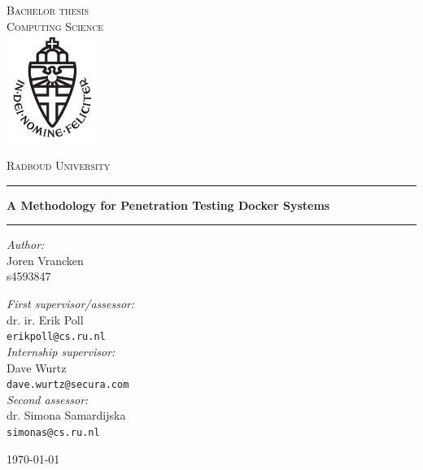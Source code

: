 \documentclass[11pt,a4paper]{report}
\begin{document}
    \hypersetup{pageanchor=false}
    \begin{titlepage}
        \begin{center}
            \textsc{\LARGE Bachelor thesis\\Computing Science}\\[1.5cm]
            \includegraphics[height=100pt]{resources/images/logo}

            \vspace{0.4cm}
            \textsc{\Large Radboud University}\\[1cm]
            \hrule
            \vspace{0.4cm}
            \textbf{\huge A Methodology for Penetration Testing Docker Systems}\\[0.4cm]
            \hrule
            \vspace{2cm}
            \begin{minipage}[t]{0.45\textwidth}
                \begin{flushleft} \large
                    \textit{Author:}\\
                    Joren Vrancken\\
                    s4593847
                \end{flushleft}
            \end{minipage}
            \begin{minipage}[t]{0.45\textwidth}
                \begin{flushright} \large
                    \textit{First supervisor/assessor:}\\
                    dr. ir. Erik Poll\\
                    \texttt{erikpoll@cs.ru.nl}\\[1.3cm]
                    \textit{Internship supervisor:}\\
                    Dave Wurtz\\
                    \texttt{dave.wurtz@secura.com}\\[1.3cm]
                    \textit{Second assessor:}\\
                    dr. Simona Samardijska\\
                    \texttt{simonas@cs.ru.nl}\\
                \end{flushright}
            \end{minipage}
            \vfill {\large \today}
        \end{center}
    \end{titlepage}
\end{document}
